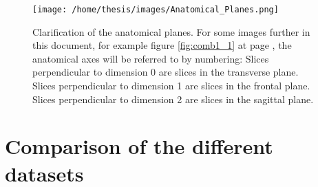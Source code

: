\FloatBarrier
\begin{SCfigure}[][htb]
    \centering
    \texttt{[image: /home/thesis/images/Anatomical\_Planes.png]}
    \caption{\label{fig:anatomicalPlains}Clarification of the anatomical planes. 
    For some images further in this document, for example figure \ref{fig:comb1_1} at page \pageref{fig:comb1_1}, the anatomical axes will be referred to by numbering:
    Slices perpendicular to dimension 0 are slices in the transverse plane.
    Slices perpendicular to dimension 1 are slices in the frontal plane.
    Slices perpendicular to dimension 2 are slices in the sagittal plane.  
    }
\end{SCfigure}
\section{Comparison of the different datasets\label{seg:datasetcomparison}}

\FloatBarrier

\FloatBarrier

\FloatBarrier

\FloatBarrier

